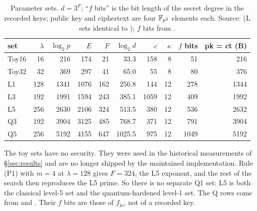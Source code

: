 \begin{table}[h]
\centering
\caption[Parameter sets]{Parameter sets. $d=3^F$; ``$f$ bits'' is the bit length of the secret
degree in the recorded keys; public key and ciphertext are four
$\mathbb{F}_{p^2}$ elements each. Source:
 (L sets identical to
); $f$ bits from
.}
\label{tab:params}
\begin{tabular}{lrrrrrrrrr}
\toprule
set & $\lambda$ & $\log_2 p$ & $E$ & $F$ & $\log_2 d$ & $c$ & $\kappa$ & $f$ bits & pk = ct (B)\\
\midrule
Toy16 & 16 & 216 & 174 & 21 & 33.3 & 158 & 8 & 51 & 216\\
Toy32 & 32 & 369 & 297 & 41 & 65.0 & 55 & 8 & 80 & 376\\
L1 & 128 & 1341 & 1076 & 162 & 256.8 & 144 & 12 & 278 & 1344\\
L3 & 192 & 1991 & 1594 & 243 & 385.1 & 1059 & 12 & 409 & 1992\\
L5 & 256 & 2630 & 2106 & 324 & 513.5 & 380 & 12 & 536 & 2632\\
Q3 & 192 & 3904 & 3125 & 485 & 768.7 & 371 & 12 & 791 & 3904\\
Q5 & 256 & 5192 & 4155 & 647 & 1025.5 & 975 & 12 & 1049 & 5192\\
\bottomrule
\end{tabular}
\end{table}

The toy sets have no security. They were used in the historical
measurements of \S\ref{sec:results} and are no longer shipped by the
maintained implementation. Rule (P1) with $m=4$ at $\lambda=128$ gives
$F=324$, the L5 exponent, and the rest of the search then reproduces the L5
prime. So there is no separate Q1 set: L5 is both the classical level-5 set
and the quantum-hardened level-1 set. The Q rows come from
 and . Their $f$ bits
are those of $f_{\mathrm{lo}}$, not of a recorded key.
